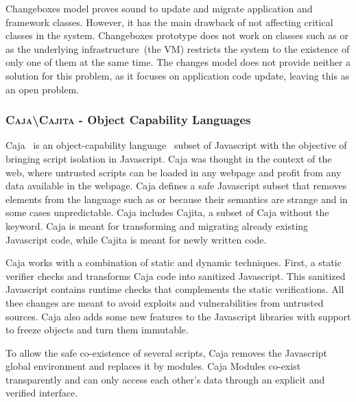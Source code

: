 Changeboxes model proves sound to update and migrate application and framework classes. However, it has the main drawback of not affecting critical classes in the system. Changeboxes prototype does not work on classes such as  or  as the underlying infrastructure~(the VM) restricts the system to the existence of only one of them at the same time. The changes model does not provide neither a solution for this problem, as it focuses on application code update, leaving this as an open problem.

\subsubsection*{\textsc{Caja\textbackslash Cajita} - Object Capability Languages}

Caja~\cite{Mill08a} is an object-capability language~\cite{Levy84a,Mill03a,Spoo00a} subset of Javascript with the objective of bringing script isolation in Javascript. Caja was thought in the context of the web, where untrusted scripts can be loaded in any webpage and profit from any data available in the webpage. Caja defines a safe Javascript subset that removes elements from the language such as  or  because their semantics are strange and in some cases unpredictable. Caja includes Cajita, a subset of Caja without the  keyword. Caja is meant for transforming and migrating already existing Javascript code, while Cajita is meant for newly written code.

Caja works with a combination of static and dynamic techniques. First, a static verifier checks and transforms Caja code into sanitized Javascript. This sanitized Javascript contains runtime checks that complements the static verifications. All thee changes are meant to avoid exploits and vulnerabilities from untrusted sources. Caja also adds some new features to the Javascript libraries with support to freeze objects and turn them immutable. 

To allow the safe co-existence of several scripts, Caja removes the Javascript global environment and replaces it by modules. Caja Modules co-exist transparently and can only access each other's data through an explicit and verified interface.
%


